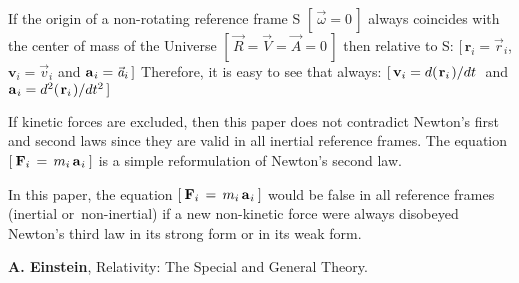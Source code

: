 \documentclass[10pt]{article}
\begin{document}
\par \bigskip\smallskip \noindent If the origin of a non-rotating reference frame S $[ \, {\vec{\omega}} = 0 \, ]$ always coincides with the center of mass of the Universe $[ \, {\vec{\mathit{R}}} = {\vec{\mathit{V}}} = {\vec{\mathit{A}}} = 0 \, ]$ then relative to S: $[ \, {\mathbf{r}}_i = {\vec{\mathit{r}}}_i$, ${\mathbf{v}}_i = {\vec{\mathit{v}}}_i$ and ${\mathbf{a}}_{\hspace{+0.045em}i} = {\vec{\mathit{a}}}_i \, ]$ Therefore, it is easy to see that always: $[ \, {\mathbf{v}}_i = d(\hspace{+0.090em}{\mathbf{r}}_i\hspace{+0.090em})/dt$ $\;$and$\;$ ${\mathbf{a}}_{\hspace{+0.045em}i} = d^2(\hspace{+0.090em}{\mathbf{r}}_i\hspace{+0.090em})/dt^2 \, ]$

\par \bigskip\smallskip \noindent If kinetic forces are excluded, then this paper does not contradict Newton's first and second laws since they are valid in all inertial reference frames. The equation $[ \: {\mathbf{F}}_i \,=\, m_i \, {\mathbf{a}}_{\hspace{+0.045em}i} \: ]$ is a simple reformulation of Newton's second law.

\par \bigskip\smallskip \noindent In this paper, the equation $[ \: {\mathbf{F}}_i \,=\, m_i \, {\mathbf{a}}_{\hspace{+0.045em}i} \: ]$ would be false in all reference frames (\hspace{+0.180em}inertial \hbox {or non-inertial\hspace{+0.180em})} if a new non-kinetic force were always disobeyed Newton's third law in its strong form or in its weak form.

\vspace{-0.90em}

\par {}

\par \bigskip\smallskip \noindent \textbf{A. Einstein}, Relativity: The Special and General Theory.
\end{document}
